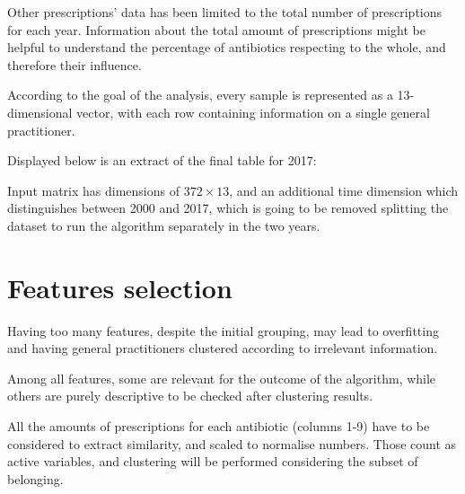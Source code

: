 Other prescriptions' data has been limited to the total number of prescriptions for each year. Information about the total amount of prescriptions might be helpful to understand the percentage of antibiotics respecting to the whole, and therefore their influence.

According to the goal of the analysis, every sample is represented as a 13-dimensional vector, with each row containing information on a single general practitioner.

Displayed below is an extract of the final table for 2017:
\begin{center}
	\begin{table}[h]
\caption{\small $k$-means matrix extract, Campania Millennium database}
\vspace{-20px}
\end{table}
\end{center}

Input matrix has dimensions of $372 \times 13$, and an additional time dimension which distinguishes between 2000 and 2017, which is going to be removed splitting the dataset to run the algorithm separately in the two years.

\section{Features selection}
Having too many features, despite the initial grouping, may lead to overfitting and having general practitioners clustered according to irrelevant information.

Among all features, some are relevant for the outcome of the algorithm, while others are purely descriptive to be checked after clustering results.

All the amounts of prescriptions for each antibiotic (columns 1-9) have to be considered to extract similarity, and scaled to normalise numbers. Those count as active variables, and clustering will be performed considering the subset of belonging.

